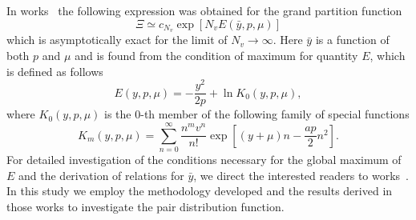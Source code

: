 In works~\cite{KozitskyKozlovskiiDobush2018book,KozitskyKozlovskiiDobush2020} the following expression was obtained for the grand partition function
\begin{equation}
	\Xi \simeq c_{N_v} \exp[N_v E(\bar{y}, p, \mu)]
\end{equation}
which is asymptotically exact for the limit of $N_v \to \infty$. Here $\bar{y}$ is a function of both $p$ and $\mu$ and is found from the condition of maximum for quantity $E$, which is defined as follows
\begin{equation*}
	E(y, p, \mu) = -\frac{y^2}{2p} + \ln K_0(y,p,\mu),
\end{equation*}
where $K_0(y,p,\mu)$ is the $0$-th member of the following family of special functions
\begin{equation*}
	K_m(y,p,\mu) = \sum_{n=0}^{\infty} \frac{n^m v^n}{n!} \exp[(y+\mu)n - \frac{a p}{2}n^2].
\end{equation*}
For detailed investigation of the conditions necessary for the global maximum of $E$ and the derivation of relations for $\bar{y}$, we direct the interested readers to works~\cite{KozitskyKozlovskiiDobush2018book,KozitskyKozlovskiiDobush2020,KozlovskiiDobush2022}. In this study we employ the methodology developed and the results derived in those works to investigate the pair distribution function. 
